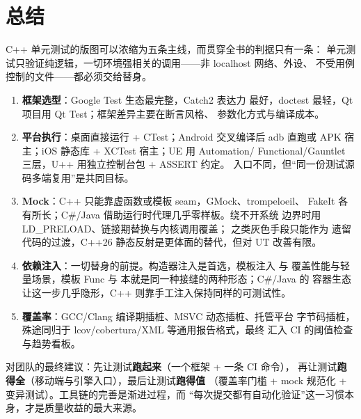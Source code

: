 \documentclass[12pt,a4paper,fontset=fandol]{ctexbook}
\begin{document}
\chapter{总结}

C++ 单元测试的版图可以浓缩为五条主线，而贯穿全书的判据只有一条：
单元测试只验证纯逻辑，一切环境强相关的调用——非 localhost 网络、外设、
不受用例控制的文件——都必须交给替身。

\begin{enumerate}
  \item \textbf{框架选型}：Google Test 生态最完整，Catch2 表达力
        最好，doctest 最轻，Qt 项目用 Qt Test；框架差异主要在断言风格、
        参数化方式与编译成本。
  \item \textbf{平台执行}：桌面直接运行 + CTest；Android 交叉编译后
        adb 直跑或 APK 宿主；iOS 静态库 + XCTest 宿主；UE 用 Automation/
        Functional/Gauntlet 三层，U++ 用独立控制台包 + ASSERT 约定。
        入口不同，但“同一份测试源码多端复用”是共同目标。
  \item \textbf{Mock}：C++ 只能靠虚函数或模板 seam，GMock、trompeloeil、
        FakeIt 各有所长；C\#/Java 借助运行时代理几乎零样板。绕不开系统
        边界时用 LD\_PRELOAD、链接期替换与内核调用覆盖；
         之类灰色手段只能作为
        遗留代码的过渡，C++26 静态反射是更体面的替代，但对 UT 改善有限。
  \item \textbf{依赖注入}：一切替身的前提。构造器注入是首选，模板注入
        与  覆盖性能与轻量场景，模板 Func 与
         本就是同一种接缝的两种形态；C\#/Java 的
        容器生态让这一步几乎隐形，C++ 则靠手工注入保持同样的可测试性。
  \item \textbf{覆盖率}：GCC/Clang 编译期插桩、MSVC 动态插桩、托管平台
        字节码插桩，殊途同归于 lcov/cobertura/XML 等通用报告格式，最终
        汇入 CI 的阈值检查与趋势看板。
\end{enumerate}

对团队的最终建议：先让测试\textbf{跑起来}（一个框架 + 一条 CI 命令），
再让测试\textbf{跑得全}（移动端与引擎入口），最后让测试\textbf{跑得值}
（覆盖率门槛 + mock 规范化 + 变异测试）。工具链的完善是渐进过程，而
“每次提交都有自动化验证”这一习惯本身，才是质量收益的最大来源。
\end{document}
